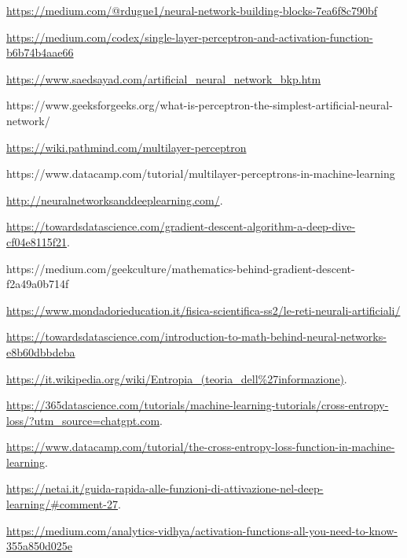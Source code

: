 \begin{thebibliography}{99}
\url{https://medium.com/@rdugue1/neural-network-building-blocks-7ea6f8c790bf}

\url{https://medium.com/codex/single-layer-perceptron-and-activation-function-b6b74b4aae66}

\url{https://www.saedsayad.com/artificial_neural_network_bkp.htm}

https://www.geeksforgeeks.org/what-is-perceptron-the-simplest-artificial-neural-network/

\url{https://wiki.pathmind.com/multilayer-perceptron}

https://www.datacamp.com/tutorial/multilayer-perceptrons-in-machine-learning

\url{http://neuralnetworksanddeeplearning.com/}.

\url{https://towardsdatascience.com/gradient-descent-algorithm-a-deep-dive-cf04e8115f21}.

https://medium.com/geekculture/mathematics-behind-gradient-descent-f2a49a0b714f

\url{https://www.mondadorieducation.it/fisica-scientifica-ss2/le-reti-neurali-artificiali/}


\url{https://towardsdatascience.com/introduction-to-math-behind-neural-networks-e8b60dbbdeba}

\url{https://it.wikipedia.org/wiki/Entropia_(teoria_dell%27informazione)}.

\url{https://365datascience.com/tutorials/machine-learning-tutorials/cross-entropy-loss/?utm_source=chatgpt.com}.

\url{https://www.datacamp.com/tutorial/the-cross-entropy-loss-function-in-machine-learning}.

\url{https://netai.it/guida-rapida-alle-funzioni-di-attivazione-nel-deep-learning/#comment-27}.

\url{https://medium.com/analytics-vidhya/activation-functions-all-you-need-to-know-355a850d025e}


\end{thebibliography}
